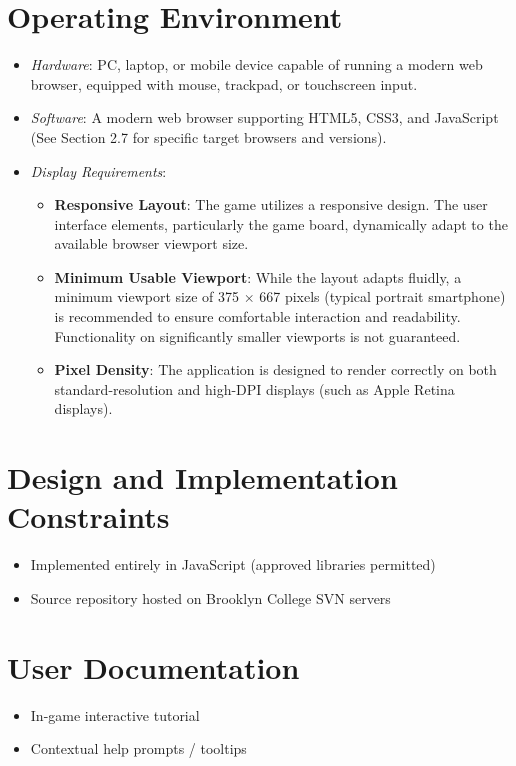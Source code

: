 \documentclass[11pt]{scrreprt}
\begin{document}
\section{Operating Environment}
\begin{itemize}
    \item \emph{Hardware}: PC, laptop, or mobile device capable of running a modern web browser, equipped with mouse, trackpad, or touchscreen input.
    \item \emph{Software}: A modern web browser supporting HTML5, CSS3, and JavaScript (See Section 2.7 for specific target browsers and versions).
    \item \emph{Display Requirements}:
        \begin{itemize}
            \item \textbf{Responsive Layout}: The game utilizes a responsive design. The user interface elements, particularly the game board, dynamically adapt to the available browser viewport size.
            \item \textbf{Minimum Usable Viewport}: While the layout adapts fluidly, a minimum viewport size of 375 $\times$ 667 pixels (typical portrait smartphone) is recommended to ensure comfortable interaction and readability. Functionality on significantly smaller viewports is not guaranteed.
            \item \textbf{Pixel Density}: The application is designed to render correctly on both standard-resolution and high-DPI displays (such as Apple Retina displays).
        \end{itemize}
\end{itemize}

\section{Design and Implementation Constraints}
\begin{itemize}
  \item Implemented entirely in JavaScript (approved libraries permitted)
  \item Source repository hosted on Brooklyn College SVN servers
\end{itemize}

\section{User Documentation}
\begin{itemize}
  \item In-game interactive tutorial
  \item Contextual help prompts / tooltips
\end{itemize}
\end{document}
